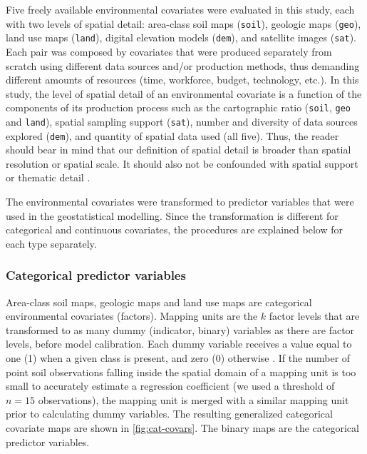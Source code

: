 Five freely available environmental covariates were evaluated in this study, 
each with two levels of spatial detail: area-class soil maps (\texttt{soil}), 
geologic maps (\texttt{geo}), land use maps (\texttt{land}), digital elevation 
models (\texttt{dem}), and satellite images (\texttt{sat}). Each pair was 
composed by covariates that were produced separately from scratch using 
different data sources and/or production methods, thus demanding different 
amounts of resources (time, workforce, budget, technology, etc.). In this study,
the level of spatial detail of an environmental covariate is a function of the 
components of its production process such as the cartographic ratio 
(\texttt{soil}, \texttt{geo} and \texttt{land}), spatial sampling support 
(\texttt{sat}), number and diversity of data sources explored (\texttt{dem}),
and quantity of spatial data used (all five). Thus, the reader should bear in
mind that our definition of spatial detail is broader than spatial resolution
or spatial scale. It should also not be confounded with spatial support 
\citep{WebsterEtAl2007} or thematic detail \citep{Rossiter2000}.

The environmental covariates were transformed to predictor variables that were 
used in the geostatistical modelling. Since the transformation is different for
categorical and continuous covariates, the procedures are explained below for 
each type separately.

\subsubsection*{Categorical predictor variables}
\label{subsubsec:categorical-covars}

Area-class soil maps, geologic maps and land use maps are categorical 
environmental covariates (factors). Mapping units are the $k$ factor levels that
are transformed to as many dummy (indicator, binary) variables as there are 
factor levels, before model calibration. Each dummy variable receives a value 
equal to one (1) when a given class is present, and zero (0) otherwise 
\citep{Everitt2006}. If the number of point soil observations falling inside 
the spatial domain of a mapping unit is too small to accurately estimate a 
regression coefficient (we used a threshold of $n=15$ observations), the mapping
unit is merged with a similar mapping unit prior to calculating dummy variables.
The resulting generalized categorical covariate maps are shown in 
\autoref{fig:cat-covars}. The binary maps are the categorical predictor variables.

